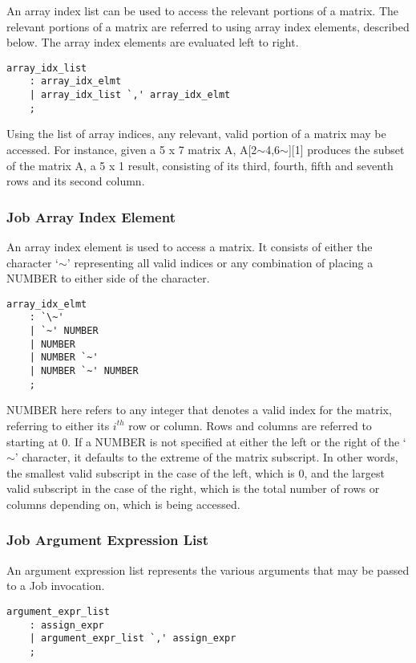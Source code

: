 \documentclass[prodmode,acmtecs]{acmsmall}
\begin{document}
An array index list can be used to access the relevant portions of a matrix. 
The relevant portions of a matrix are referred to using array index elements, 
described below. The array index elements are evaluated left to right.

\begin{lstlisting}
array_idx_list
	: array_idx_elmt
	| array_idx_list `,' array_idx_elmt
	;
\end{lstlisting}

Using the list of array indices, any relevant, valid portion of a matrix may
be accessed. For instance, given a 5 x 7 matrix A, A[2$\sim$4,6$\sim$][1] produces the
subset of the matrix A, a 5 x 1 result, consisting of its third, fourth, 
fifth and seventh rows and its second column.

\subsubsection{Job Array Index Element}

An array index element is used to access a matrix. It consists of either 
the character `$\sim$' representing all valid indices or any combination of placing
a NUMBER to either side of the character. 

\begin{lstlisting}
array_idx_elmt
	: `\~'
	| `~' NUMBER
	| NUMBER
	| NUMBER `~'
	| NUMBER `~' NUMBER
	;
\end{lstlisting}

NUMBER here refers to any integer that denotes a valid index for the 
matrix, referring to either its $i^{th}$ row or column. Rows and columns are 
referred to starting at 0. If a NUMBER is not specified at either 
the left or the right of the `$\sim$' character, it defaults to the extreme 
of the matrix subscript. In other words, the smallest valid subscript in 
the case of the left, which is 0, and the largest valid subscript in the 
case of the right, which is the total number of rows or columns depending
on, which is being accessed.

\subsubsection{Job Argument Expression List}

An argument expression list represents the various arguments that may be
passed to a Job invocation. 

\begin{lstlisting}
argument_expr_list
	: assign_expr
	| argument_expr_list `,' assign_expr
	;
\end{lstlisting}
\end{document}
